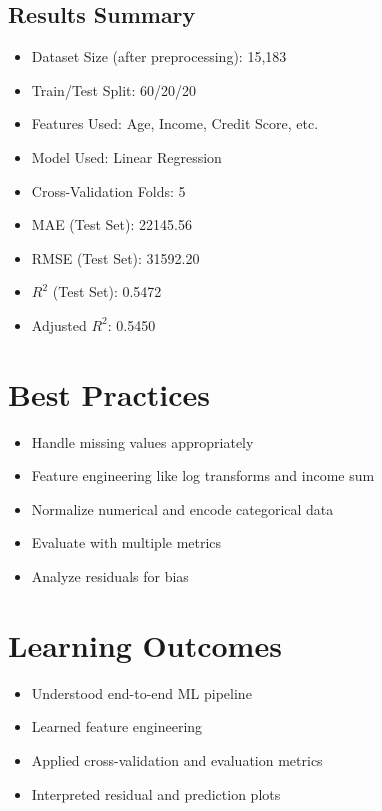 \documentclass[12pt]{article}
\begin{document}
\vspace{1em}
\subsection*{Results Summary}
\begin{itemize}
  \item Dataset Size (after preprocessing): 15,183
  \item Train/Test Split: 60/20/20
  \item Features Used: Age, Income, Credit Score, etc.
  \item Model Used: Linear Regression
  \item Cross-Validation Folds: 5
  \item MAE (Test Set): 22145.56
  \item RMSE (Test Set): 31592.20
  \item $R^2$ (Test Set): 0.5472
  \item Adjusted $R^2$: 0.5450
\end{itemize}

\section*{Best Practices}
\begin{itemize}
  \item Handle missing values appropriately
  \item Feature engineering like log transforms and income sum
  \item Normalize numerical and encode categorical data
  \item Evaluate with multiple metrics
  \item Analyze residuals for bias
\end{itemize}

\section*{Learning Outcomes}
\begin{itemize}
  \item Understood end-to-end ML pipeline
  \item Learned feature engineering
  \item Applied cross-validation and evaluation metrics
  \item Interpreted residual and prediction plots
\end{itemize}
\end{document}
